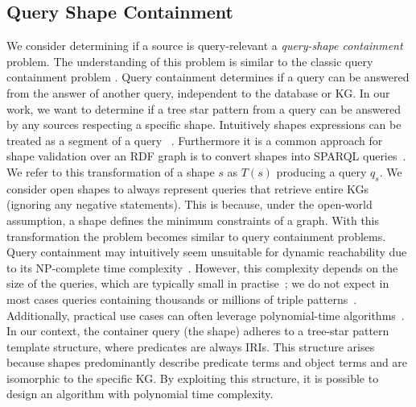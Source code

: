 \subsection{Query Shape Containment}\label{sec:containment}

We consider determining if a source is query-relevant a \emph{query-shape containment} problem.
The understanding of this problem is similar to the classic query containment problem .
Query containment determines if a query can be answered from the answer of another query, independent to the database or KG.
In our work, we want to determine if a tree star pattern from a query can be answered by any sources respecting a specific shape.
Intuitively shapes expressions can be treated as a segment of a query~\cite{delva2023} .
Furthermore it is a common approach for shape validation over an RDF graph is to convert shapes into SPARQL queries~\cite{labragayo2017validatingdescribinglinkeddata, Corman2019,Prestamo2023, spapeExpressionConvert}.~
We refer to this transformation of a shape $s$ as $T(s)$ producing a query $q_s$.
We consider open shapes to always represent queries that retrieve entire KGs (ignoring any negative statements).  
This is because, under the open-world assumption, a shape defines the minimum constraints of a graph.
With this transformation the problem  becomes similar to query containment problems.
Query containment may intuitively seem unsuitable for dynamic reachability due to its NP-complete time complexity~\cite{Spasi2023}.
However, this complexity depends on the size of the queries, which are typically small in practise~\cite{Doan2012}; we do not expect in most cases queries containing thousands or millions of triple patterns~\cite{Bonifati2019}.
Additionally, practical use cases can often leverage polynomial-time algorithms~\cite{Doan2012}.
In our context, the container query  (the shape) adheres to a tree-star pattern template structure, where predicates are always IRIs.
This structure arises because shapes predominantly describe predicate terms and object terms and are isomorphic to the specific KG.
By exploiting this structure, it is possible to design an algorithm with polynomial time complexity.

